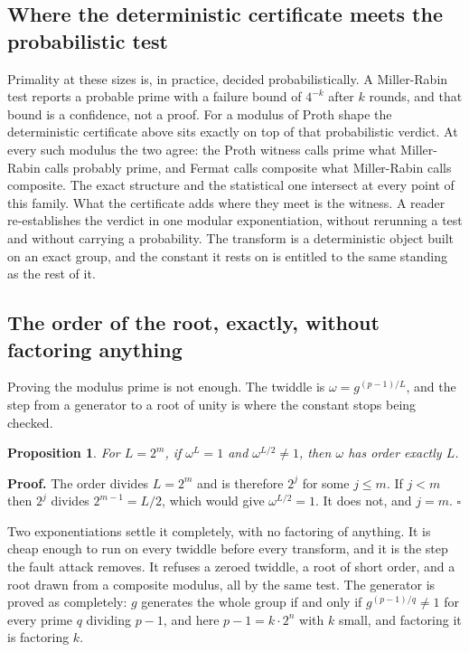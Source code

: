 \documentclass{article}
\newtheorem{proposition}{Proposition}
\begin{document}
\subsection{Where the deterministic certificate meets the probabilistic test}

Primality at these sizes is, in practice, decided probabilistically. A Miller-Rabin test reports a probable prime with a failure bound of \(4^{-k}\) after \(k\) rounds, and that bound is a confidence, not a proof. For a modulus of Proth shape the deterministic certificate above sits exactly on top of that probabilistic verdict. At every such modulus the two agree: the Proth witness calls prime what Miller-Rabin calls probably prime, and Fermat calls composite what Miller-Rabin calls composite. The exact structure and the statistical one intersect at every point of this family. What the certificate adds where they meet is the witness. A reader re-establishes the verdict in one modular exponentiation, without rerunning a test and without carrying a probability. The transform is a deterministic object built on an exact group, and the constant it rests on is entitled to the same standing as the rest of it.

\subsection{The order of the root, exactly, without factoring anything}

Proving the modulus prime is not enough. The twiddle is \(\omega = g^{(p-1)/L}\), and the step from a generator to a root of unity is where the constant stops being checked.

\begin{proposition}
For \(L = 2^m\), if \(\omega^L = 1\) and \(\omega^{L/2} \ne 1\), then \(\omega\) has order exactly \(L\).
\end{proposition}

\textbf{Proof.} The order divides \(L = 2^m\) and is therefore \(2^j\) for some \(j \le m\). If \(j < m\) then \(2^j\) divides \(2^{m-1} = L/2\), which would give \(\omega^{L/2} = 1\). It does not, and \(j = m\). \(\square\)

Two exponentiations settle it completely, with no factoring of anything. It is cheap enough to run on every twiddle before every transform, and it is the step the fault attack removes. It refuses a zeroed twiddle, a root of short order, and a root drawn from a composite modulus, all by the same test. The generator is proved as completely: \(g\) generates the whole group if and only if \(g^{(p-1)/q} \ne 1\) for every prime \(q\) dividing \(p-1\), and here \(p - 1 = k \cdot 2^n\) with \(k\) small, and factoring it is factoring \(k\).
\end{document}
